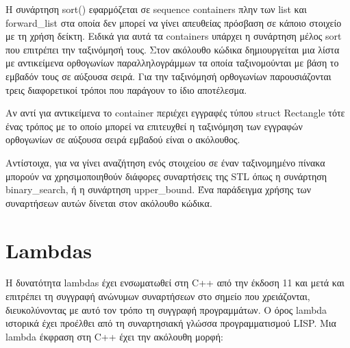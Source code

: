 



Η συνάρτηση sort() εφαρμόζεται σε sequence containers πλην των list και forward\_list στα οποία δεν μπορεί να γίνει απευθείας πρόσβαση σε κάποιο στοιχείο με τη χρήση δείκτη. Ειδικά για αυτά τα containers υπάρχει η συνάρτηση μέλος sort που επιτρέπει την ταξινόμησή τους. Στον ακόλουθο κώδικα δημιουργείται μια λίστα με αντικείμενα ορθογωνίων παραλληλογράμμων τα οποία ταξινομούνται με βάση το εμβαδόν τους σε αύξουσα σειρά. Για την ταξινόμησή ορθογωνίων παρουσιάζονται τρεις διαφορετικοί τρόποι που παράγουν το ίδιο αποτέλεσμα.









Αν αντί για αντικείμενα το container περιέχει εγγραφές τύπου struct Rectangle τότε ένας τρόπος με το οποίο μπορεί να επιτευχθεί η ταξινόμηση των εγγραφών ορθογωνίων σε αύξουσα σειρά εμβαδού είναι ο ακόλουθος.



Αντίστοιχα, για να γίνει αναζήτηση ενός στοιχείου σε έναν ταξινομημένο πίνακα μπορούν να χρησιμοποιηθούν διάφορες συναρτήσεις της STL όπως η συνάρτηση binary\_search, ή η συνάρτηση upper\_bound. Ένα παράδειγμα χρήσης των συναρτήσεων αυτών δίνεται στον ακόλουθο κώδικα.





\section{Lambdas}
Η δυνατότητα lambdas έχει ενσωματωθεί στη C++ από την έκδοση 11 και μετά και επιτρέπει τη συγγραφή ανώνυμων συναρτήσεων στο σημείο που χρειάζονται, διευκολύνοντας με αυτό τον τρόπο τη συγγραφή προγραμμάτων. O όρος lambda ιστορικά έχει προέλθει από τη συναρτησιακή γλώσσα προγραμματισμού LISP. Μια lambda έκφραση στη C++ έχει την ακόλουθη μορφή:


